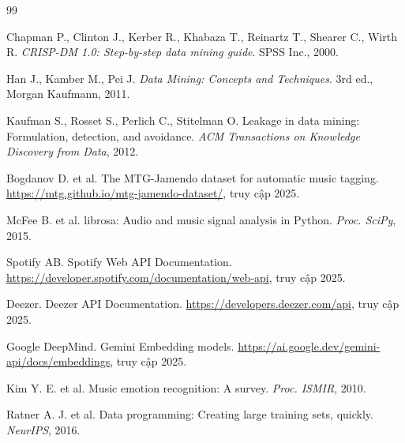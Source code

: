 \begin{thebibliography}{99}

Chapman P., Clinton J., Kerber R., Khabaza T., Reinartz T., Shearer C., Wirth R.
\newblock \textit{CRISP-DM 1.0: Step-by-step data mining guide}.
\newblock SPSS Inc., 2000.

Han J., Kamber M., Pei J.
\newblock \textit{Data Mining: Concepts and Techniques}.
\newblock 3rd ed., Morgan Kaufmann, 2011.

Kaufman S., Rosset S., Perlich C., Stitelman O.
\newblock Leakage in data mining: Formulation, detection, and avoidance.
\newblock \textit{ACM Transactions on Knowledge Discovery from Data}, 2012.

Bogdanov D. et al.
\newblock The MTG-Jamendo dataset for automatic music tagging.
\newblock \url{https://mtg.github.io/mtg-jamendo-dataset/}, truy cập 2025.

McFee B. et al.
\newblock librosa: Audio and music signal analysis in Python.
\newblock \textit{Proc. SciPy}, 2015.

Spotify AB.
\newblock Spotify Web API Documentation.
\newblock \url{https://developer.spotify.com/documentation/web-api}, truy cập 2025.

Deezer.
\newblock Deezer API Documentation.
\newblock \url{https://developers.deezer.com/api}, truy cập 2025.

Google DeepMind.
\newblock Gemini Embedding models.
\newblock \url{https://ai.google.dev/gemini-api/docs/embeddings}, truy cập 2025.

Kim Y. E. et al.
\newblock Music emotion recognition: A survey.
\newblock \textit{Proc. ISMIR}, 2010.

Ratner A. J. et al.
\newblock Data programming: Creating large training sets, quickly.
\newblock \textit{NeurIPS}, 2016.

\end{thebibliography}
